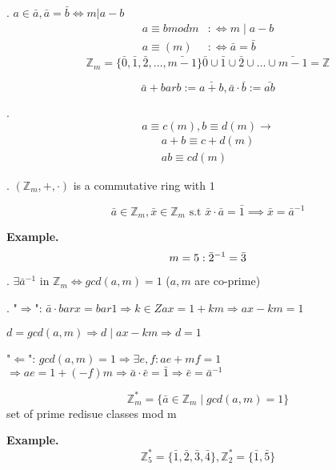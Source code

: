 \Remark.
$a\in \bar{a}, \bar{a} = \bar{b} \iff m | a-b$
\begin{align*}
  a \equiv b mod m & :\iff m \mid a-b \\
  a \equiv (m)     & :\iff \bar{a} = \bar{b}
\end{align*}
\[
  \mathbb{Z}_m = \{ \bar{0},\bar{1},\bar{2}, \ldots, \bar{m-1}\} 
  \bar{0} \cup \bar{1} \cup \bar{2} \cup  \ldots \cup \bar{m-1} = \mathbb{Z}
\]


\begin{definition}
\[
  \bar{a} + bar{b} := \bar{a+b}, \bar{a} \cdot \bar{b} := \bar{ab}
\]
\end{definition}

\Remark.
\[
  a \equiv c(m), b \equiv d(m) \rightarrow 
\]
\begin{align*}
  a+b \equiv c+d(m) \\
  ab \equiv cd (m)
\end{align*}

\Theorem.
$(\mathbb{Z}_m, + , \cdot)$ is a commutative ring with $1$

\begin{definition}
\[
  \bar{a} \in \mathbb{Z}_m, \bar{x} \in \mathbb{Z}_m \text{ s.t }
  \bar{x} \cdot \bar{a} = \bar{1} \implies \bar{x} = \bar{a}^{-1}
\]
\end{definition}

\textbf{Example.}
\[
  m = 5: \bar{2}^{-1} = \bar{3} \\
\]

\Theorem.
$\exists \bar{a}^{-1} \text{ in } \mathbb{Z}_m \iff gcd(a,m) = 1$ ($a,m$ are co-prime)

\Proof.
"$\Rightarrow$": 
  $\bar{a}\cdot bar{x} = bar{1} \Rightarrow k\in Z 
  ax = 1 + km \Rightarrow ax - km = 1$

  $d = gcd(a,m) \Rightarrow d \mid ax - km \Rightarrow d = 1$

"$\Leftarrow$":
  $gcd(a,m) = 1 \Rightarrow \exists e,f : ae + mf = 1$ \\
  $\Rightarrow ae = 1 + (-f)m \Rightarrow \bar{a} \cdot \bar{e} = \bar{1} \Rightarrow \bar{e} = \bar{a}^{-1}$

\begin{definition}
\[
  \mathbb{Z}_m^{*} = \{ \bar{a} \in \mathbb{Z}_m \mid gcd(a,m) = 1 \}
\]
set of prime redisue classes mod m
\end{definition}

\textbf{Example.}
\[
  \mathbb{Z}_5^{*} = \{ \bar{1}, \bar{2}, \bar{3}, \bar{4} \}, \mathbb{Z}_2^{*} = \{ \bar{1}, \bar{5} \}
\]

